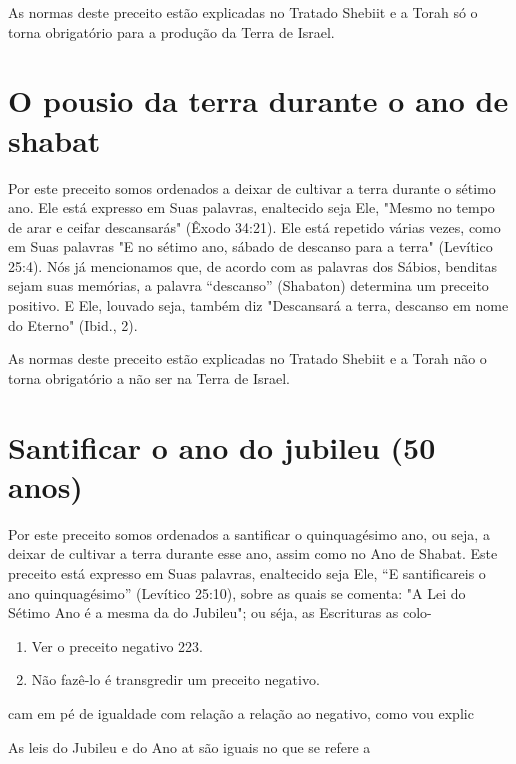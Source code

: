 As normas deste preceito estão explicadas no Tratado Shebiit e a To­rah
só o torna obrigatório para a produção da Terra de Israel.

\section{O pousio da terra durante o ano de shabat}

Por este preceito somos ordenados a deixar de cultivar a terra du­rante
o sétimo ano. Ele está expresso em Suas palavras, enaltecido seja Ele,
"Mes­mo no tempo de arar e ceifar descansarás" (Êxodo 34:21). Ele está
repetido vá­rias vezes, como em Suas palavras "E no sétimo ano, sábado
de descanso para a terra" (Levítico 25:4). Nós já mencionamos que, de
acordo com as palavras dos Sábios, benditas sejam suas memórias, a
palavra ``descanso'' (Shabaton) de­termina um preceito positivo. E Ele,
louvado seja, também diz "Descansará a terra, descanso em nome do
Eterno" (Ibid., 2).

As normas deste preceito estão explicadas no Tratado Shebiit e a To­rah
não o torna obrigatório a não ser na Terra de Israel.

\section{Santificar o ano do jubileu (50 anos)}

Por este preceito somos ordenados a santificar o quinquagésimo ano, ou
seja, a deixar de cultivar a terra durante esse ano, assim como no Ano
de Shabat. Este preceito está expresso em Suas palavras, enaltecido seja
Ele, ``E santificareis o ano quinquagésimo'' (Levítico 25:10), sobre as
quais se comen­ta: "A Lei do Sétimo Ano é a mesma da do Jubileu"; ou
séja, as Escrituras as colo-


\begin{enumerate}
\def\labelenumi{\arabic{enumi}.}
\setcounter{enumi}{170}
\item
 
 Ver o preceito negativo 223.
 
\item
 
 Não fazê-lo é transgredir um preceito negativo.
 
\end{enumerate}




cam em pé de igualdade com relação a relação ao negativo, como vou
explic

As leis do Jubileu e do Ano at são iguais no que se refere a


